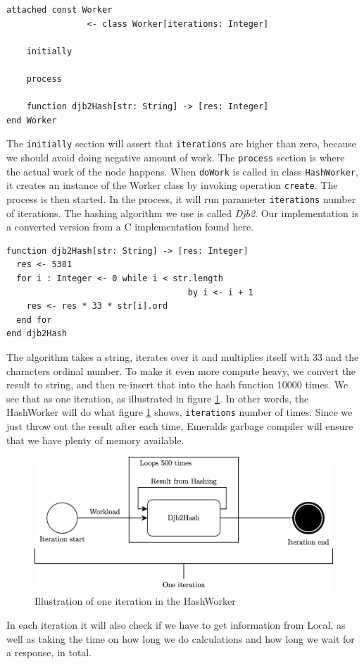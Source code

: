 \begin{minipage}{\linewidth}
\begin{lstlisting}[language=emerald]
attached const Worker 
                <- class Worker[iterations: Integer]
                
    initially
    
    process
    
    function djb2Hash[str: String] -> [res: Integer]
end Worker
\end{lstlisting}
\end{minipage}
The \verb|initially| section will assert that \verb|iterations| are higher than zero, because we should avoid doing negative amount of work. The \verb|process| section is where the actual work of the node happens. When \verb|doWork| is called in class \verb|HashWorker|, it creates an instance of the Worker class by invoking operation \verb|create|. The process is then started. In the process, it will run parameter \verb|iterations| number of iterations. The hashing algorithm we use is called \textit{Djb2}. Our implementation is a converted version from a C implementation found here\cite{noauthor_hash_nodate}. 
\begin{lstlisting}[language=emerald]
function djb2Hash[str: String] -> [res: Integer]
  res <- 5381
  for i : Integer <- 0 while i < str.length 
                                    by i <- i + 1
    res <- res * 33 * str[i].ord
  end for
end djb2Hash
\end{lstlisting}
The algorithm takes a string, iterates over it and multiplies itself with 33 and the characters ordinal number. To make it even more compute heavy, we convert the result to string, and then re-insert that into the hash function 10000 times. We see that as one iteration, as illustrated in figure \ref{fig:Hashing_algorithm_iteration}. In other words, the HashWorker will do what figure \ref{fig:Hashing_algorithm_iteration} shows, \verb|iterations| number of times. Since we just throw out the result after each time, Emeralds garbage compiler will ensure that we have plenty of memory available. 
\begin{figure}[t]
    \centering
    \includegraphics[scale=0.9]{chapters/5_implementation/figures/Iteration.png}
    \caption{Illustration of one iteration in the HashWorker}
    \label{fig:Hashing_algorithm_iteration}
\end{figure}
In each iteration it will also check if we have to get information from Local, as well as taking the time on how long we do calculations and how long we wait for a response, in total.



